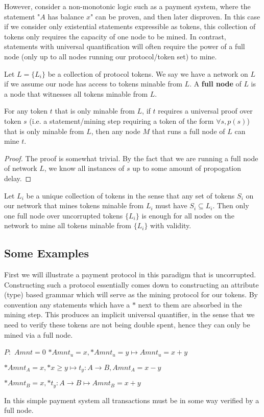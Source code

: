 \documentclass[12pt]{amsart}
\begin{document}
However, consider a non-monotonic logic such as a payment system, where the statement "$A$ has balance $x$" can be proven, and then later disproven. In this case if we consider only existential statements expressible as tokens, this collection of tokens only requires the capacity of one node to be mined. In contrast, statements with universal quantification will often require the power of a full node (only up to all nodes running our protocol/token set) to mine.

Let $L = \{L_i\}$ be a collection of protocol tokens. We say we have a network on $L$ if we assume our node has access to tokens minable from $L$. A \textbf{full node} of $L$ is a node that witnesses all tokens minable from $L$.

\begin{lem}
For any token $t$ that is only minable from $L$, if $t$ requires a universal proof over token $s$ (i.e. a statement/mining step requiring a token of the form $\forall s, p(s)$) that is only minable from $L$, then any node $M$ that runs a full node of $L$ can mine $t$.
\end{lem}
\begin{proof}
The proof is somewhat trivial. By the fact that we are running a full node of network $L$, we know all instances of $s$ up to some amount of propogation delay.
\end{proof}

\begin{cor}
Let $L_i$ be a unique collection of tokens in the sense that any set of tokens $S_i$ on our network that mines tokens minable from $L_i$ must have $S_i\subseteq L_i$. Then only one full node over uncorrupted tokens $\{L_i\}$ is enough for all nodes on the network to mine all tokens minable from $\{L_i\}$ with validity.
\end{cor}
\subsection{Some Examples}
First we will illustrate a payment protocol in this paradigm that is uncorrupted. Constructing such a protocol essentially comes down to constructing an attribute (type) based grammar which will serve as the mining protocol for our tokens. By convention any statements which have a $*$ next to them are absorbed in the mining step. This produces an implicit universal quantifier, in the sense that we need to verify these tokens are not being double spent, hence they can only be mined via a full node. \newline
\begin{algorithm}
$P:$\newline
$Amnt = 0$\newline
$*Amnt_u = x, *Amnt_u = y \mapsto Amnt_u = x+y$\newline

$*Amnt_A = x, *x \geq y \mapsto t_y:A\rightarrow B, Amnt_A = x - y$\newline

$*Amnt_B = x, *t_y: A\rightarrow B \mapsto Amnt_B = x + y$\newline

\end{algorithm}

In this simple payment system all transactions must be in some way verified by a full node.
\end{document}
